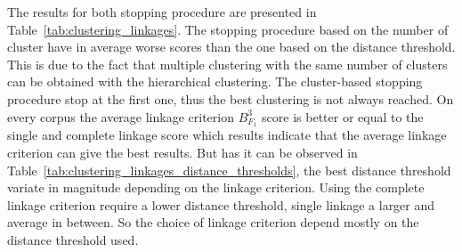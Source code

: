 The results for both stopping procedure are presented in Table~\ref{tab:clustering_linkages}.
The stopping procedure based on the number of cluster have in average worse scores than the one based on the distance threshold.
This is due to the fact that multiple clustering with the same number of clusters can be obtained with the hierarchical clustering.
The cluster-based stopping procedure stop at the first one, thus the best clustering is not always reached.
On every corpus the average linkage criterion $B^3_{F_1}$ score is better or equal to the single and complete linkage score which results indicate that the average linkage criterion can give the best results.
But has it can be observed in Table~\ref{tab:clustering_linkages_distance_thresholds}, the best distance threshold variate in magnitude depending on the linkage criterion.
Using the complete linkage criterion require a lower distance threshold, single linkage a larger and average in between.
So the choice of linkage criterion depend mostly on the distance threshold used.

